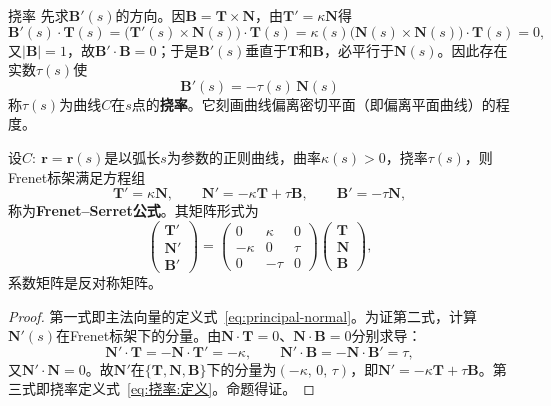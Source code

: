 \begin{mydefinition}{挠率}
	先求$\mathbf{B}'(s)$的方向。因$\mathbf{B}=\mathbf{T}\times\mathbf{N}$，由$\mathbf{T}'=\kappa\mathbf{N}$得
	\begin{equation}
		\mathbf{B}'(s)\cdot\mathbf{T}(s)
		=\bigl(\mathbf{T}'(s)\times\mathbf{N}(s)\bigr)\cdot\mathbf{T}(s)
		=\kappa(s)\bigl(\mathbf{N}(s)\times\mathbf{N}(s)\bigr)\cdot\mathbf{T}(s)=0,
		\label{eq:挠率:B垂直T}
	\end{equation}
	又$|\mathbf{B}|=1$，故$\mathbf{B}'\cdot\mathbf{B}=0$；于是$\mathbf{B}'(s)$垂直于$\mathbf{T}$和$\mathbf{B}$，必平行于$\mathbf{N}(s)$。因此存在实数$\tau(s)$使
	\begin{equation}
		\mathbf{B}'(s)=-\tau(s)\,\mathbf{N}(s)
		\label{eq:挠率:定义}
	\end{equation}
	称$\tau(s)$为曲线$C$在$s$点的\textbf{挠率}。它刻画曲线偏离密切平面（即偏离平面曲线）的程度。
\end{mydefinition}

\begin{theorem}
	设$C:\ \mathbf{r}=\mathbf{r}(s)$是以弧长$s$为参数的正则曲线，曲率$\kappa(s)>0$，挠率$\tau(s)$，则Frenet标架满足方程组
	\begin{equation}
		\mathbf{T}'=\kappa\mathbf{N},\qquad
		\mathbf{N}'=-\kappa\mathbf{T}+\tau\mathbf{B},\qquad
		\mathbf{B}'=-\tau\mathbf{N},
		\label{eq:Frenet公式:方程组}
	\end{equation}
	称为\textbf{Frenet--Serret公式}。其矩阵形式为
	\begin{equation}
		\begin{pmatrix}
			\mathbf{T}'\\ \mathbf{N}'\\ \mathbf{B}'
		\end{pmatrix}
		=
		\begin{pmatrix}
			0 & \kappa & 0\\
			-\kappa & 0 & \tau\\
			0 & -\tau & 0
		\end{pmatrix}
		\begin{pmatrix}
			\mathbf{T}\\ \mathbf{N}\\ \mathbf{B}
		\end{pmatrix},
		\label{eq:Frenet公式:矩阵形式}
	\end{equation}
	系数矩阵是反对称矩阵。
\end{theorem}

\begin{proof}
	第一式即主法向量的定义式~\eqref{eq:principal-normal}。为证第二式，计算$\mathbf{N}'(s)$在Frenet标架下的分量。由$\mathbf{N}\cdot\mathbf{T}=0$、$\mathbf{N}\cdot\mathbf{B}=0$分别求导：
	\begin{equation}
		\mathbf{N}'\cdot\mathbf{T}=-\mathbf{N}\cdot\mathbf{T}'=-\kappa,
		\qquad
		\mathbf{N}'\cdot\mathbf{B}=-\mathbf{N}\cdot\mathbf{B}'=\tau,
	\end{equation}
	又$\mathbf{N}'\cdot\mathbf{N}=0$。故$\mathbf{N}'$在$\{\mathbf{T},\mathbf{N},\mathbf{B}\}$下的分量为$(-\kappa,\,0,\,\tau)$，即$\mathbf{N}'=-\kappa\mathbf{T}+\tau\mathbf{B}$。第三式即挠率定义式~\eqref{eq:挠率:定义}。命题得证。
\end{proof}

